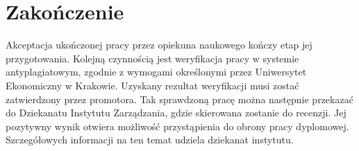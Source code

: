 \chapter*{Zakończenie}
\label{chap:zakonczenie}



Akceptacja ukończonej pracy przez opiekuna naukowego kończy etap jej przygotowania. Kolejną czynnością jest weryfikacja pracy w systemie antyplagiatowym, zgodnie z wymogami określonymi przez Uniwersytet Ekonomiczny w Krakowie. Uzyskany rezultat weryfikacji musi zostać zatwierdzony przez promotora. Tak sprawdzoną pracę można następnie przekazać do Dziekanatu Instytutu Zarządzania, gdzie skierowana zostanie do recenzji. Jej pozytywny wynik otwiera możliwość przystąpienia do obrony pracy dyplomowej. Szczegółowych informacji na ten temat udziela dziekanat instytutu. 

